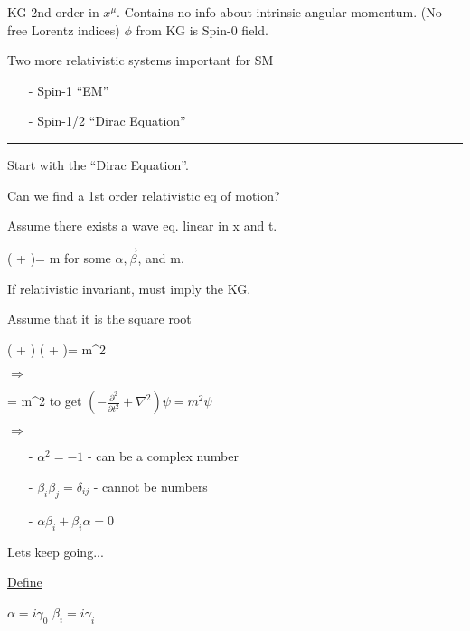 {KG 2nd order in $x^\mu$.  
Contains no info about intrinsic angular momentum. (No free Lorentz indices)
$\phi$ from KG is Spin-0 field.

\begin{tcolorbox}
Two more relativistic systems important for SM
\begin{itemize}
\item[-] Spin-1 ``EM''
\item[-] Spin-1/2 ``Dirac Equation''
\end{itemize}
\end{tcolorbox}


\noindent\rule{\textwidth}{1pt}
Start with the ``Dirac Equation''.

Can we find a 1st order relativistic eq of motion?

Assume there exists a wave eq. linear in x and t.

\be
\left(\alpha {} + \vec{\beta}\vec{\nabla}   \right)\psi = m\psi
\ee
for some $\alpha, \vec{\beta}$, and m. 

If relativistic invariant, must imply the KG. 

Assume that it is the square root

\be
\left(\alpha {} + \vec{\beta}\vec{\nabla}   \right) \left(\alpha {} + \vec{\beta}\vec{\nabla}   \right)\psi = m^2\psi
\ee

$\Rightarrow$

\be
{} \psi = m^2 \psi
\ee
to get $(-\frac{\partial^2}{\partial t^2} + \nabla^2)\psi = m^2 \psi$

$\Rightarrow$

\begin{itemize}        
\item[-] $\alpha^2 = -1$ - can be a complex number 
\item[-] $\beta_i\beta_j = \delta_{ij}$ - cannot be numbers
\item[-] $\alpha\beta_i + \beta_i\alpha = 0$
\end{itemize}        

Lets keep going...  

\underline{Define}


$\alpha = i \gamma_0 $ \hspace*{1in} $\beta_i = i \gamma_i $

}
